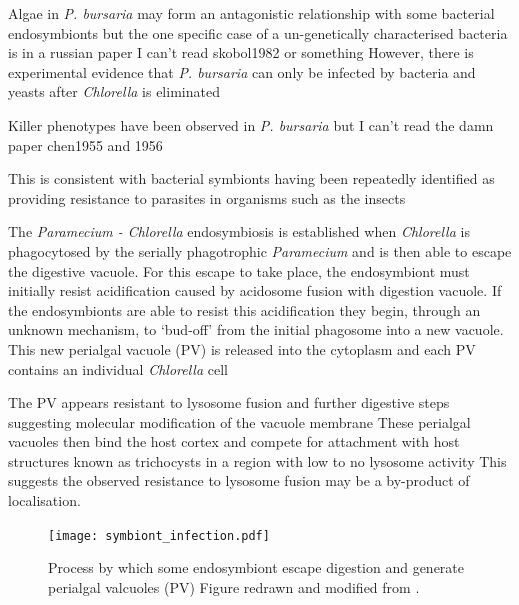 Algae in \textit{P. bursaria} may form an antagonistic relationship with some bacterial endosymbionts but the one specific case
of a un-genetically characterised bacteria is in a russian paper I can't read skobol1982 or something 
However, there is experimental evidence that \textit{P. bursaria} can only be infected by bacteria and yeasts after
\textit{Chlorella} is eliminated \citep{Gortz1982}

Killer phenotypes have been observed in \textit{P. bursaria} but I can't read the damn paper chen1955 and 1956 \citep{Gortz2009}


This is consistent with bacterial symbionts having been repeatedly identified as providing resistance to parasites in organisms
such as the insects \citep{Martinez2014}




The \textit{Paramecium - Chlorella} endosymbiosis is established when \textit{Chlorella} is phagocytosed by the serially phagotrophic \textit{Paramecium} and is then able to escape the digestive vacuole.  
For this escape to take place, the endosymbiont must initially resist acidification caused by acidosome fusion with digestion vacuole.  
If the endosymbionts are able to resist this acidification they begin, through an unknown mechanism, to `bud-off' from the initial phagosome into a new vacuole.  
This new perialgal vacuole (PV) is released into the cytoplasm and each PV contains an individual \textit{Chlorella} cell \citep{Kodama2009}

The PV appears resistant to lysosome fusion and further digestive steps suggesting molecular modification of the vacuole membrane \citep{Johnson2011}
These perialgal vacuoles then bind the host cortex and compete for attachment with host structures known as trichocysts \citep{Kodama2012} in a region with low to no lysosome activity \citep{Kodama2009}
This suggests the observed resistance to lysosome fusion may be a by-product of localisation. 


\begin{figure}[h!]
    \caption{
        Process by which some endosymbiont escape digestion and generate perialgal valcuoles (PV)
    Figure redrawn and modified from \citep{Kodama2009}.}
        \texttt{[image: symbiont\_infection.pdf]}
\end{figure}


